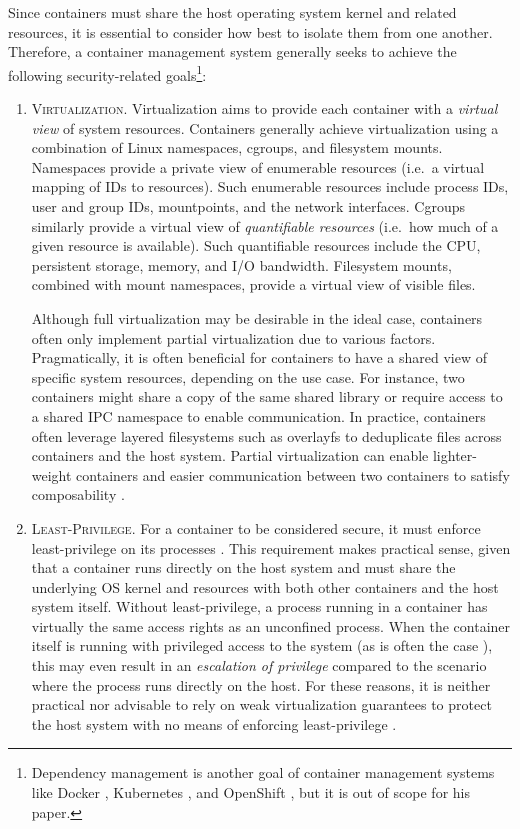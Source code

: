 Since containers must share the host operating system kernel and related resources, it is essential to consider how best to isolate them from one another. Therefore, a container management system generally seeks to achieve the following security-related goals\footnote{Dependency management is another goal of container management systems like Docker \cite{docker}, Kubernetes \cite{kubernetes}, and OpenShift \cite{openshift}, but it is out of scope for his paper.}:
\begin{enumerate}[label=\bfseries CG\arabic*., ref=CG\arabic*, labelindent=1em]
  \item \textsc{Virtualization.}
    Virtualization aims to provide each container with a \textit{virtual view} of system resources. Containers generally achieve virtualization using a combination of Linux namespaces, cgroups, and filesystem mounts. Namespaces provide a private view of enumerable resources (i.e.~a virtual mapping of IDs to resources). Such enumerable resources include process IDs, user and group IDs, mountpoints, and the network interfaces. Cgroups similarly provide a virtual view of \textit{quantifiable resources} (i.e.~how much of a given resource is available). Such quantifiable resources include the CPU, persistent storage, memory, and I/O bandwidth. Filesystem mounts, combined with mount namespaces, provide a virtual view of visible files.

    Although full virtualization may be desirable in the ideal case, containers often only implement partial virtualization \cite{sultan2019_container_security,xin2018_container_security} due to various factors. Pragmatically, it is often beneficial for containers to have a shared view of specific system resources, depending on the use case. For instance, two containers might share a copy of the same shared library or require access to a shared IPC namespace to enable communication. In practice, containers often leverage layered filesystems such as overlayfs \cite{edge2010_overlayfs} to deduplicate files across containers and the host system. Partial virtualization can enable lighter-weight containers and easier communication between two containers to satisfy composability \cite{sultan2019_container_security}.

  \item \textsc{Least-Privilege.}
    For a container to be considered secure, it must enforce least-privilege on its processes \cite{sultan2019_container_security}. This requirement makes practical sense, given that a container runs directly on the host system and must share the underlying OS kernel and resources with both other containers and the host system itself. Without least-privilege, a process running in a container has virtually the same access rights as an unconfined process. When the container itself is running with privileged access to the system (as is often the case \cite{sultan2019_container_security,xin2018_container_security}), this may even result in an \textit{escalation of privilege} compared to the scenario where the process runs directly on the host. For these reasons, it is neither practical nor advisable to rely on weak virtualization guarantees to protect the host system with no means of enforcing least-privilege \cite{sultan2019_container_security}.


\end{enumerate}
